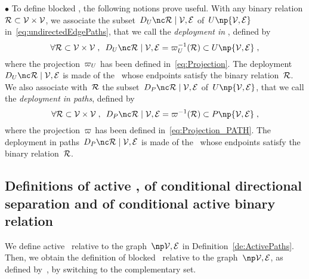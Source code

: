 \documentclass[12pt]{article}
\def\citep#1{\cite{#1}}
\begin{document}
{{{{{\noindent \(\bullet\)
To define blocked \undirectedEdgePaths, 
the following notions prove useful. 
With any binary relation \( \mathcal{R} \subset {\cal V}\times{\cal V} \),
we associate the subset~\( \DeploymentInUPaths{\relation}{\OrientedGraph} \)
of~\( \UPATH\np{\OrientedGraph} \) in~\eqref{eq:undirectedEdgePaths},
that we call the \emph{deployment in \undirectedEdgePaths}, 
defined by 
\begin{equation}
  \forall \relation \subset \VERTEX\times\VERTEX 
  \eqsepv 
  \DeploymentInUPaths{\relation}{\OrientedGraph}
  = \Projection_{\UPATH}^{-1}(\relation) \subset \UPATH\np{\OrientedGraph} 
  \eqfinv
  \label{eq:DeploymentInUPaths}
\end{equation}
where the projection~\( \varpi_{U} \) has been defined
in~\eqref{eq:Projection}.
The deployment \(\DeploymentInUPaths{\relation}{\OrientedGraph} \)
is made of the \undirectedEdgePaths\ whose endpoints satisfy the 
binary relation~\( \mathcal{R} \).
%
We also associate with~\( \mathcal{R} \)
the subset~\( \DeploymentInPaths{\relation}{\OrientedGraph} \)
of~\( \UPATH\np{\OrientedGraph} \),
that we call the \emph{deployment in paths},
defined by 
\begin{equation}
  \forall \relation \subset \VERTEX\times\VERTEX 
  \eqsepv 
  \DeploymentInPaths{\relation}{\OrientedGraph}
  = \Projection^{-1}(\relation) \subset \PATH\np{\OrientedGraph} 
  \eqfinv
  \label{eq:DeploymentInPaths}
\end{equation}
where the projection~\( \varpi \) has been defined
in~\eqref{eq:Projection_PATH}.
The deployment in paths~\( \DeploymentInPaths{\relation}{\OrientedGraph} \)
is made of the \EdgePaths\  whose endpoints satisfy the 
binary relation~\( \mathcal{R} \).


\subsection{Definitions of active \undirectedEdgePaths, of  conditional
  directional separation and of conditional active binary relation}
\label{Definition_of_the_conditional_directional_separation_binary_relation}


We define active \undirectedEdgePaths\ relative to the graph~$\npOrientedGraph$
in Definition~\ref{de:ActivePaths}.
Then, we  obtain the definition of blocked \undirectedEdgePaths\ relative to the
graph~$\npOrientedGraph$, as defined by~\citep{PEARL1986357}, by switching to the
complementary set.

}}}}}
\end{document}
